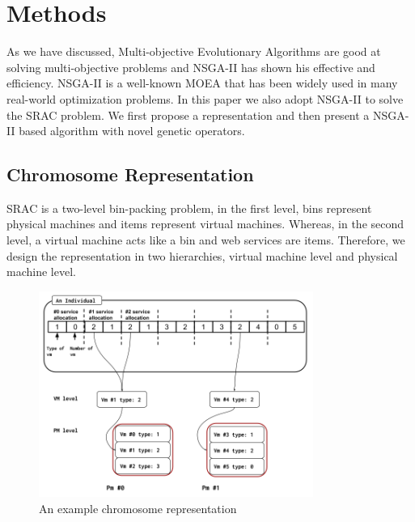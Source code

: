 \section{Methods}
\label{sec:method}
As we have discussed, Multi-objective Evolutionary Algorithms are good at solving 
multi-objective problems and NSGA-II \cite{nsgaii} has shown his effective and efficiency. NSGA-II is a well-known MOEA that has been widely used
in many real-world optimization problems. 
In this paper we also adopt NSGA-II to solve the SRAC problem. 
We first propose a representation and then present a NSGA-II based algorithm with novel genetic operators.

\subsection{Chromosome Representation}
SRAC is a two-level bin-packing problem, in the first level, 
bins represent physical machines and items represent virtual machines. Whereas, in the second level, a virtual machine acts like a bin and web services are items. 
Therefore, we design the representation in two hierarchies, virtual machine level and physical machine level. 

\begin{figure}
\centering
  \includegraphics[width=0.8\textwidth]{pics/preliminary/cec.png}
  \caption{An example chromosome representation}
  \label{fig:rep}
\end{figure}


